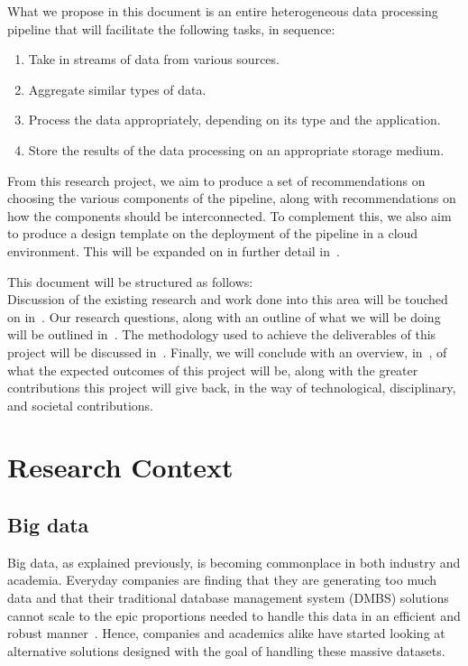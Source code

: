 \documentclass[a4paper,11pt]{article}
\begin{document}
What we propose in this document is an entire heterogeneous data processing pipeline that will facilitate the following
tasks, in sequence:

\begin{enumerate}
  \item Take in streams of data from various sources.
  \item Aggregate similar types of data.
  \item Process the data appropriately, depending on its type and the application.
  \item Store the results of the data processing on an appropriate storage medium.
\end{enumerate}

From this research project, we aim to produce a set of recommendations on choosing the various components of the
pipeline, along with recommendations on how the components should be interconnected. To complement this, we also aim to
produce a design template on the deployment of the pipeline in a cloud environment. This will be expanded on in further
detail in~.

This document will be structured as follows:\\
Discussion of the existing research and work done into this area will be
touched on in~. Our research questions, along with an outline of what we will be doing
will be outlined in~. The methodology used to achieve the deliverables of this project will be
discussed in~. Finally, we will conclude with an overview, in~,
of what the expected outcomes of this project will be, along with the greater contributions this project will give back,
in the way of technological, disciplinary, and societal contributions.




\section{Research Context} %
\label{sec:research_context}

\subsection{Big data} %
\label{sub:big_data}

Big data, as explained previously, is becoming commonplace in both industry and academia. Everyday companies are finding
that they are generating too much data and that their traditional database management system (DMBS) solutions cannot
scale to the epic proportions needed to handle this data in an efficient and robust manner~\cite{marz2013principles}.
Hence, companies and academics alike have started looking at alternative solutions designed with the goal of handling
these massive datasets.
\end{document}
